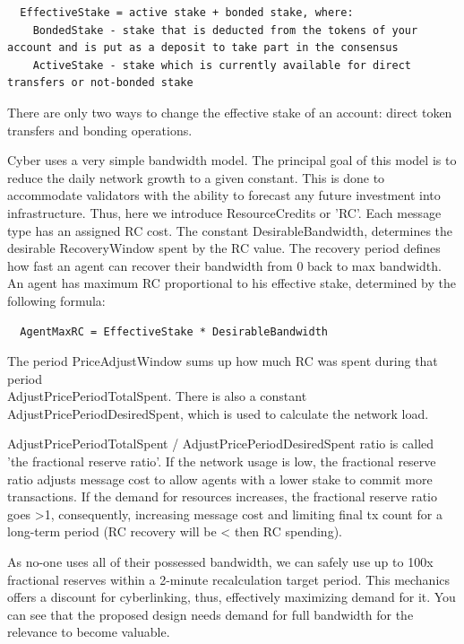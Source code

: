 \documentclass[8pt,oneside]{amsart}
\newcommand{\code}[1]{{\PlayBold #1}}
\begin{document}
\begin{Abstract}
\begin{lstlisting}
  EffectiveStake = active stake + bonded stake, where:
    BondedStake - stake that is deducted from the tokens of your account and is put as a deposit to take part in the consensus
    ActiveStake - stake which is currently available for direct transfers or not-bonded stake
\end{lstlisting}

There are only two ways to change the effective stake of an account: direct token transfers and bonding operations.

Cyber uses a very simple bandwidth model. The principal goal of this model is to reduce the daily network growth to a given constant. This is done to accommodate validators with the ability to forecast any future investment into infrastructure. Thus, here we introduce \code{ResourceCredits} or 'RC'. Each message type has an assigned RC cost. The constant \code{DesirableBandwidth}, determines the desirable \code{RecoveryWindow} spent by the RC value. The recovery period defines how fast an agent can recover their bandwidth from 0 back to max bandwidth. An agent has maximum RC  proportional to his effective stake, determined by the following formula:

\begin{lstlisting}
  AgentMaxRC = EffectiveStake * DesirableBandwidth
\end{lstlisting}

The period \code{PriceAdjustWindow} sums up how much RC was spent during that period\\ \code{AdjustPricePeriodTotalSpent}. There is also a constant \code{AdjustPricePeriodDesiredSpent}, which is used to calculate the network load.

\code{AdjustPricePeriodTotalSpent / AdjustPricePeriodDesiredSpent} ratio is called 'the fractional reserve ratio'. If the network usage is low, the fractional reserve ratio adjusts message cost to allow agents with a lower stake to commit more transactions. If the demand for resources increases, the fractional reserve ratio goes \code{>1}, consequently, increasing message cost and limiting final tx count for a long-term period (RC recovery will be \code{<} then RC spending).

As no-one uses all of their possessed bandwidth, we can safely use up to 100x fractional reserves within a 2-minute recalculation target period. This mechanics offers a discount for cyberlinking, thus, effectively maximizing demand for it. You can see that the proposed design needs demand for full bandwidth for the relevance to become valuable.


\end{Abstract}
\end{document}
